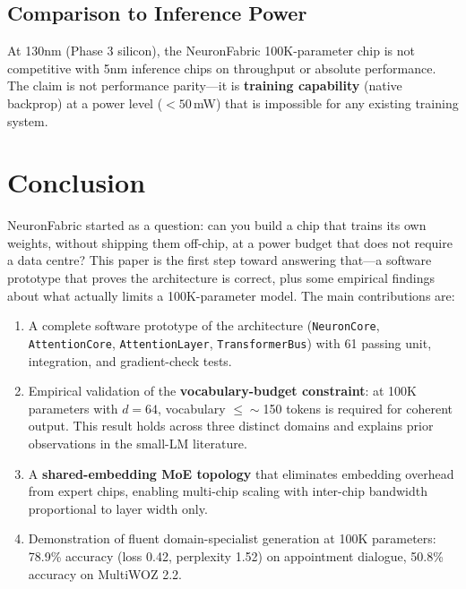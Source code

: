 \documentclass[11pt]{article}
\begin{document}
\subsection{Comparison to Inference Power}

At 130nm (Phase 3 silicon), the NeuronFabric 100K-parameter chip is not competitive
with 5nm inference chips on throughput or absolute performance. The claim is not
performance parity---it is \textbf{training capability} (native backprop) at a power
level ($<50$\,mW) that is impossible for any existing training system.

\section{Conclusion}

NeuronFabric started as a question: can you build a chip that trains its own weights,
without shipping them off-chip, at a power budget that does not require a data centre?
This paper is the first step toward answering that---a software prototype that proves
the architecture is correct, plus some empirical findings about what actually limits
a 100K-parameter model. The main contributions are:

\begin{enumerate}
\item A complete software prototype of the architecture (\texttt{NeuronCore},
  \texttt{AttentionCore}, \texttt{AttentionLayer}, \texttt{TransformerBus}) with
  61 passing unit, integration, and gradient-check tests.

\item Empirical validation of the \textbf{vocabulary-budget constraint}: at 100K
  parameters with $d=64$, vocabulary $\leq\sim$150 tokens is required for coherent
  output. This result holds across three distinct domains and explains prior
  observations in the small-LM literature.

\item A \textbf{shared-embedding MoE topology} that eliminates embedding overhead
  from expert chips, enabling multi-chip scaling with inter-chip bandwidth proportional
  to layer width only.

\item Demonstration of fluent domain-specialist generation at 100K parameters:
  78.9\% accuracy (loss 0.42, perplexity 1.52) on appointment dialogue,
  50.8\% accuracy on MultiWOZ 2.2.
\end{enumerate}
\end{document}
